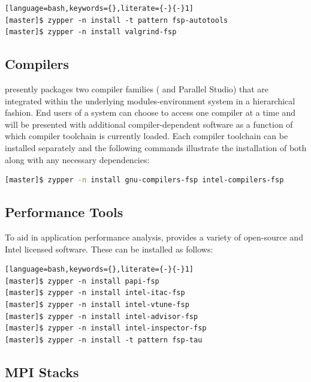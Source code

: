 \documentclass[letterpaper]{article}
\begin{document}
\begin{lstlisting}[language=bash,keywords={},literate={-}{-}1]
[master]$ zypper -n install -t pattern fsp-autotools
[master]$ zypper -n install valgrind-fsp
\end{lstlisting}

\subsection{Compilers}

\FSP{} presently packages two compiler families ({\GNU{}} and {\Intel{}
  Parallel Studio}) that are integrated within the underlying
modules-environment system in a hierarchical fashion. End users of a \FSP{}
system can choose to access one compiler at a time and will be presented with
additional compiler-dependent software as a function of which compiler
toolchain is currently loaded. Each compiler toolchain can be installed
separately and the following commands illustrate the installation of both along
with any necessary dependencies:

\begin{lstlisting}[language=bash]
[master]$ zypper -n install gnu-compilers-fsp intel-compilers-fsp
\end{lstlisting}

\subsection{Performance Tools}

To aid in application performance analysis, \FSP{} provides a variety of
open-source and Intel licensed software. These can be installed as follows:

\begin{lstlisting}[language=bash,keywords={},literate={-}{-}1]
[master]$ zypper -n install papi-fsp
[master]$ zypper -n install intel-itac-fsp
[master]$ zypper -n install intel-vtune-fsp
[master]$ zypper -n install intel-advisor-fsp
[master]$ zypper -n install intel-inspector-fsp
[master]$ zypper -n install -t pattern fsp-tau
\end{lstlisting}

\subsection{MPI Stacks} \label{sec:mpi}
\end{document}
